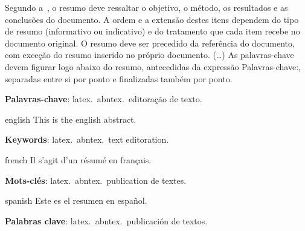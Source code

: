 \setlength{\absparsep}{18pt} %
\begin{resumo}
Segundo a~, o resumo deve ressaltar o
objetivo, o método, os resultados e as conclusões do documento. A ordem e a extensão
destes itens dependem do tipo de resumo (informativo ou indicativo) e do
tratamento que cada item recebe no documento original. O resumo deve ser
precedido da referência do documento, com exceção do resumo inserido no
próprio documento. (\ldots) As palavras-chave devem figurar logo abaixo do
resumo, antecedidas da expressão Palavras-chave:, separadas entre si por
ponto e finalizadas também por ponto.

\textbf{Palavras-chave}: latex.\ abntex.\ editoração de texto.
\end{resumo}

\begin{resumo}[Abstract]
\begin{otherlanguage*}{english}
This is the english abstract.

\vspace{\onelineskip}

\noindent
\textbf{Keywords}: latex.\ abntex.\ text editoration.
\end{otherlanguage*}
\end{resumo}

\begin{resumo}[Résumé]
\begin{otherlanguage*}{french}
    Il s'agit d'un résumé en français.

\textbf{Mots-clés}: latex.\ abntex.\ publication de textes.
\end{otherlanguage*}
\end{resumo}

\begin{resumo}[Resumen]
\begin{otherlanguage*}{spanish}
Este es el resumen en español.

\textbf{Palabras clave}: latex.\ abntex.\ publicación de textos.
\end{otherlanguage*}
\end{resumo}
